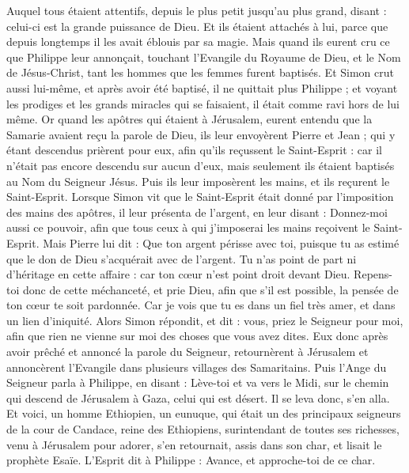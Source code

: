 \begin{multicols}{2}
Auquel tous étaient attentifs, depuis le plus petit jusqu'au plus grand, disant : celui-ci est la grande puissance de Dieu.
Et ils étaient attachés à lui, parce que depuis longtemps il les avait éblouis par sa magie.
Mais quand ils eurent cru ce que Philippe leur annonçait, touchant l'Evangile du Royaume de Dieu, et le Nom de Jésus-Christ, tant les hommes que les femmes furent baptisés.
Et Simon crut aussi lui-même, et après avoir été baptisé, il ne quittait plus Philippe ; et voyant les prodiges et les grands miracles qui se faisaient, il était comme ravi hors de lui même.
Or quand les apôtres qui étaient à Jérusalem, eurent entendu que la Samarie avaient reçu la parole de Dieu, ils leur envoyèrent Pierre et Jean ;
qui y étant descendus prièrent pour eux, afin qu'ils reçussent le Saint-Esprit :
car il n'était pas encore descendu sur aucun d'eux, mais seulement ils étaient baptisés au Nom du Seigneur Jésus.
Puis ils leur imposèrent les mains, et ils reçurent le Saint-Esprit.
Lorsque Simon vit que le Saint-Esprit était donné par l'imposition des mains des apôtres, il leur présenta de l'argent,
en leur disant : Donnez-moi aussi ce pouvoir, afin que tous ceux à qui j'imposerai les mains reçoivent le Saint-Esprit.
Mais Pierre lui dit : Que ton argent périsse avec toi, puisque tu as estimé que le don de Dieu s'acquérait avec de l'argent.
Tu n'as point de part ni d'héritage en cette affaire : car ton cœur n'est point droit devant Dieu.
Repens-toi donc de cette méchanceté, et prie Dieu, afin que s'il est possible, la pensée de ton cœur te soit pardonnée.
Car je vois que tu es dans un fiel très amer, et dans un lien d'iniquité.
Alors Simon répondit, et dit : vous, priez le Seigneur pour moi, afin que rien ne vienne sur moi des choses que vous avez dites.
Eux donc après avoir prêché et annoncé la parole du Seigneur, retournèrent à Jérusalem et annoncèrent l'Evangile dans plusieurs villages des Samaritains.
Puis l'Ange du Seigneur parla à Philippe, en disant : Lève-toi et va vers le Midi, sur le chemin qui descend de Jérusalem à Gaza, celui qui est désert.
Il se leva donc, s'en alla. Et voici, un homme Ethiopien, un eunuque, qui était un des principaux seigneurs de la cour de Candace, reine des Ethiopiens, surintendant de toutes ses richesses, venu à Jérusalem pour adorer,
s'en retournait, assis dans son char, et lisait le prophète Esaïe.
L'Esprit dit à Philippe : Avance, et approche-toi de ce char.

\end{multicols}
